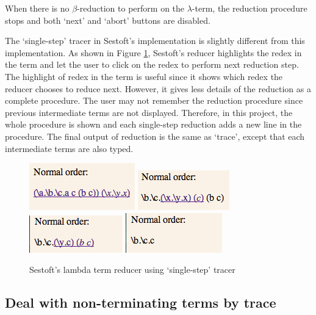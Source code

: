 When there is no $\beta$-reduction to perform on the $\lambda$-term, the reduction procedure stops and both `next' and `abort' buttons are disabled.

The `single-step' tracer in Sestoft's implementation is slightly different from this implementation. As shown in Figure \ref{fig:sstf}, Sestoft's reducer highlights the redex in the term and let the user to click on the redex to perform next reduction step. The highlight of redex in the term is useful since it shows which redex the reducer chooses to reduce next. However, it gives less details of the reduction as a complete procedure. The user may not remember the reduction procedure since previous intermediate terms are not displayed. Therefore, in this project, the whole procedure is shown and each single-step reduction adds a new line in the procedure. The final output of reduction is the same as `trace', except that each intermediate terms are also typed.

\begin{figure}[ht]
\centering
\includegraphics[scale=0.5]{pics/sestoft1}
\hfill
\includegraphics[scale=0.6]{pics/sestoft2}
\hfill
\includegraphics[scale=0.6]{pics/sestoft3}
\hfill
\includegraphics[scale=0.6]{pics/sestoft4}
\hfill
\caption{Sestoft's lambda term reducer using `single-step' tracer}
\label{fig:sstf}
\end{figure}

   

\subsection{Deal with non-terminating terms by trace}

